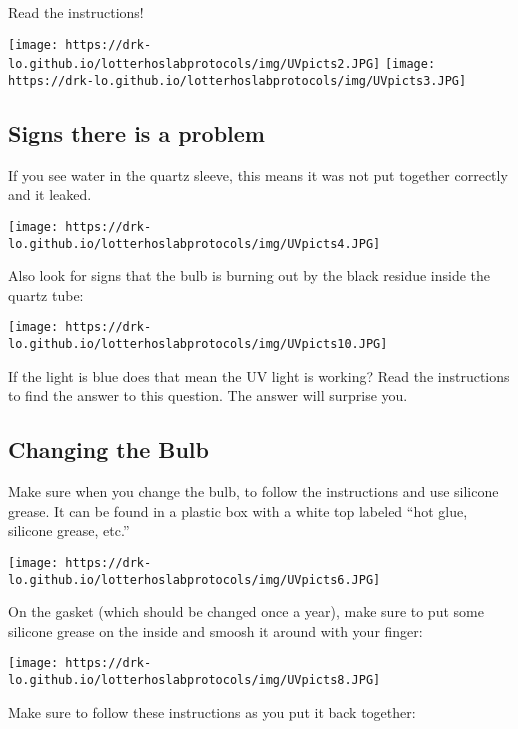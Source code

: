 \documentclass[
  letterpaper,
  DIV=11,
  numbers=noendperiod]{scrreprt}
\begin{document}

Read the instructions!

\texttt{[image: https://drk-lo.github.io/lotterhoslabprotocols/img/UVpicts2.JPG]}
\texttt{[image: https://drk-lo.github.io/lotterhoslabprotocols/img/UVpicts3.JPG]}

\hypertarget{signs-there-is-a-problem}{%
\subsection*{\texorpdfstring{\textbf{Signs there is a
problem}}{Signs there is a problem}}\label{signs-there-is-a-problem}}

If you see water in the quartz sleeve, this means it was not put
together correctly and it leaked.

\texttt{[image: https://drk-lo.github.io/lotterhoslabprotocols/img/UVpicts4.JPG]}

Also look for signs that the bulb is burning out by the black residue
inside the quartz tube:

\texttt{[image: https://drk-lo.github.io/lotterhoslabprotocols/img/UVpicts10.JPG]}

If the light is blue does that mean the UV light is working? Read the
instructions to find the answer to this question. The answer will
surprise you.

\hypertarget{changing-the-bulb}{%
\subsection*{\texorpdfstring{\textbf{Changing the
Bulb}}{Changing the Bulb}}\label{changing-the-bulb}}

Make sure when you change the bulb, to follow the instructions and use
silicone grease. It can be found in a plastic box with a white top
labeled ``hot glue, silicone grease, etc.''

\texttt{[image: https://drk-lo.github.io/lotterhoslabprotocols/img/UVpicts6.JPG]}

On the gasket (which should be changed once a year), make sure to put
some silicone grease on the inside and smoosh it around with your
finger:

\texttt{[image: https://drk-lo.github.io/lotterhoslabprotocols/img/UVpicts8.JPG]}

Make sure to follow these instructions as you put it back together:
\end{document}
